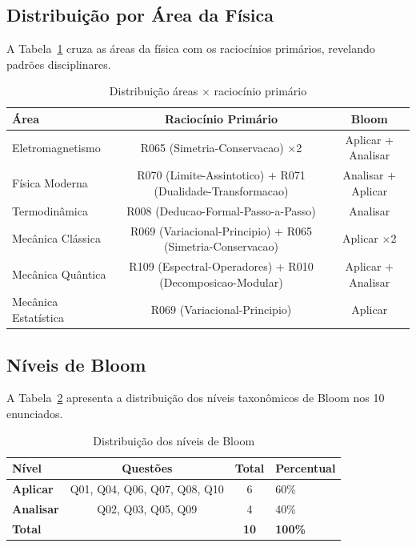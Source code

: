 \documentclass[12pt,a4paper]{article}
\newcommand{\bloom}[1]{\textcolor{verdeexame}{\textbf{#1}}}
\begin{document}
\subsection{Distribuição por Área da Física}

A Tabela~\ref{tab:areas} cruza as áreas da física com os raciocínios
primários, revelando padrões disciplinares.

\begin{table}[H]
\centering
\caption{Distribuição áreas $\times$ raciocínio primário}
\label{tab:areas}
\begin{tabular}{lcc}
\toprule
\textbf{Área} & \textbf{Raciocínio Primário} & \textbf{Bloom} \\
\midrule
Eletromagnetismo & R065 (Simetria-Conservacao) $\times$2 & Aplicar + Analisar \\
Física Moderna & R070 (Limite-Assintotico) + R071 (Dualidade-Transformacao) & Analisar + Aplicar \\
Termodinâmica & R008 (Deducao-Formal-Passo-a-Passo) & Analisar \\
Mecânica Clássica & R069 (Variacional-Principio) + R065 (Simetria-Conservacao) & Aplicar $\times$2 \\
Mecânica Quântica & R109 (Espectral-Operadores) + R010 (Decomposicao-Modular) & Aplicar + Analisar \\
Mecânica Estatística & R069 (Variacional-Principio) & Aplicar \\
\bottomrule
\end{tabular}
\end{table}

\subsection{Níveis de Bloom}

A Tabela~\ref{tab:bloom} apresenta a distribuição dos níveis taxonômicos
de Bloom nos 10 enunciados.

\begin{table}[H]
\centering
\caption{Distribuição dos níveis de Bloom}
\label{tab:bloom}
\begin{tabular}{lccl}
\toprule
\textbf{Nível} & \textbf{Questões} & \textbf{Total} & \textbf{Percentual} \\
\midrule
\bloom{Aplicar} & Q01, Q04, Q06, Q07, Q08, Q10 & 6 & 60\% \\
\bloom{Analisar} & Q02, Q03, Q05, Q09 & 4 & 40\% \\
\midrule
\textbf{Total} & & \textbf{10} & \textbf{100\%} \\
\bottomrule
\end{tabular}
\end{table}
\end{document}
